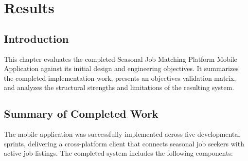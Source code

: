 \chapter{Results}
\label{ch:results}

\section{Introduction}
This chapter evaluates the completed Seasonal Job Matching Platform Mobile Application against its initial design and engineering objectives. It summarizes the completed implementation work, presents an objectives validation matrix, and analyzes the structural strengths and limitations of the resulting system.

\section{Summary of Completed Work}
The mobile application was successfully implemented across five developmental sprints, delivering a cross-platform client that connects seasonal job seekers with active job listings. The completed system includes the following components:
